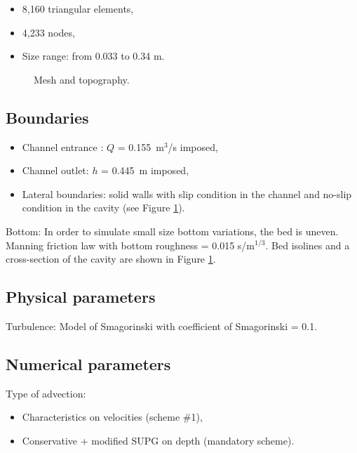 \begin{itemize}
\item 8,160 triangular elements,
\item 4,233 nodes,
\item Size range: from 0.033 to 0.34 m.
\end{itemize}

\begin{figure}
 \centering
 \caption{Mesh and topography.}\label{fig:cavity:mesh}
\end{figure}

\subsection{Boundaries}

\begin{itemize}
\item Channel entrance : $Q$ = 0.155~m$^{3}$/s imposed,
\item Channel outlet: $h$ = 0.445~m imposed,
\item Lateral boundaries: solid walls with slip condition in the channel and no-slip
condition in the cavity (see Figure \ref{fig:cavity:mesh}).
\end{itemize}

Bottom:
In order to simulate small size bottom variations, the bed is uneven.
Manning friction law with bottom roughness = 0.015 s/m$^{1/3}$.
Bed isolines and a cross-section of the cavity are shown in Figure
\ref{fig:cavity:mesh}.

\subsection{Physical parameters}

Turbulence: Model of Smagorinski with coefficient of Smagorinski = 0.1.

\subsection{Numerical parameters}

Type of advection:
\begin{itemize}
\item Characteristics on velocities (scheme \#1),
\item Conservative + modified SUPG on depth (mandatory scheme).
\end{itemize}

